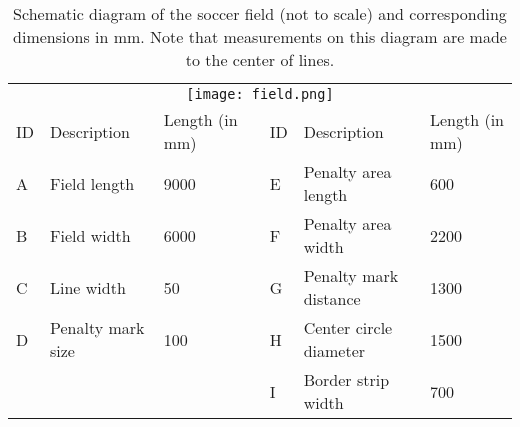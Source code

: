 \begin{table}[h]
\begin{adjustbox}{max width=\textwidth}
\begin{tabular}{lllllll}
\multicolumn{7}{c}{\texttt{[image: field.png]}}\\
\multicolumn{1}{|l|}{ID} & \multicolumn{1}{l|}{Description}       & \multicolumn{1}{l|}{Length (in mm)} & \multicolumn{1}{l|}{} & \multicolumn{1}{l|}{ID} & \multicolumn{1}{l|}{Description}            & \multicolumn{1}{l|}{Length (in mm)} \\ \cline{1-3} \cline{5-7} 
\multicolumn{1}{|l|}{A}  & \multicolumn{1}{l|}{Field length}      & \multicolumn{1}{l|}{9000}           & \multicolumn{1}{l|}{} & \multicolumn{1}{l|}{E}  & \multicolumn{1}{l|}{Penalty area length}    & \multicolumn{1}{l|}{600}            \\ \cline{1-3} \cline{5-7} 
\multicolumn{1}{|l|}{B}  & \multicolumn{1}{l|}{Field width}       & \multicolumn{1}{l|}{6000}           & \multicolumn{1}{l|}{} & \multicolumn{1}{l|}{F}  & \multicolumn{1}{l|}{Penalty area width}     & \multicolumn{1}{l|}{2200}           \\ \cline{1-3} \cline{5-7} 
\multicolumn{1}{|l|}{C}  & \multicolumn{1}{l|}{Line width}        & \multicolumn{1}{l|}{50}             & \multicolumn{1}{l|}{} & \multicolumn{1}{l|}{G}  & \multicolumn{1}{l|}{Penalty mark distance}  & \multicolumn{1}{l|}{1300}           \\ \cline{1-3} \cline{5-7} 
\multicolumn{1}{|l|}{D}  & \multicolumn{1}{l|}{Penalty mark size} & \multicolumn{1}{l|}{100}            & \multicolumn{1}{l|}{} & \multicolumn{1}{l|}{H}  & \multicolumn{1}{l|}{Center circle diameter} & \multicolumn{1}{l|}{1500}           \\ \cline{1-3} \cline{5-7} 
\multicolumn{1}{|l|}{}   & \multicolumn{1}{l|}{}                  & \multicolumn{1}{l|}{}               & \multicolumn{1}{l|}{} & \multicolumn{1}{l|}{I}  & \multicolumn{1}{l|}{Border strip width}     & \multicolumn{1}{l|}{700}           
\end{tabular}
\end{adjustbox}
\caption[Schematic diagram of the soccer field.]{Schematic diagram of the soccer field (not to scale) and corresponding dimensions in
  mm. Note that measurements on this diagram are made to the center of lines. \cite{Committee2013}}
\label{tab:field}
\end{table}
